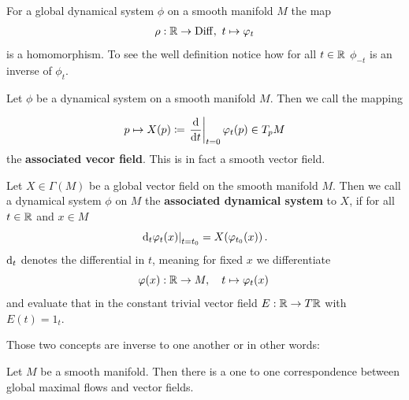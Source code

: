 \begin{corollary}
	For a global dynamical system $\phi$ on a smooth manifold $M$ the map
	\begin{align*}
		\rho: \mathbb{R} \to \operatorname{\mathrm{Diff}},~t\mapsto \varphi_t
	\end{align*}is a homomorphism. To see the well definition notice how for all $t\in \mathbb{R}$ $\phi_{-t}$ is an inverse of $\phi_t$.
\end{corollary}
\begin{definition}
	Let $\phi$ be a dynamical system on a smooth manifold $M$. Then we call the mapping
	
	\begin{align*}
		p\mapsto X(p)\coloneq \left.\frac{\mathop{}\!\mathrm{d} }{\mathop{}\!\mathrm{d} t}\right|_{t=0}\varphi_t(p)\in T_pM
	\end{align*} the \textbf{associated vecor field}. This is in fact a smooth vector field. 
\end{definition}
\begin{definition}
	Let $X\in \Gamma(M)$ be a global vector field on the smooth manifold $M$. Then we call a dynamical system $\phi$ on $M$ the \textbf{associated dynamical system} to $X$, if for all $t\in \mathbb{R}$ and $x\in M$ 
	\begin{equation*}
		\left.\mathop{}\!\mathrm{d}_t \varphi_t(x)\right|_{t=t_0}=X(\varphi_{t_0}(x))\,.
	\end{equation*} $\mathop{}\!\mathrm{d}_t$ denotes the differential in $t$, meaning for fixed $x$ we differentiate 
	\begin{equation*}
		\varphi(x): \mathbb{R}\to M,\quad t\mapsto \varphi_t(x)\,
	\end{equation*} and evaluate that in the constant trivial vector field $E: \mathbb{R}\to T\mathbb{R}$ with $E(t)=1_t$. 
\end{definition}
Those two concepts are inverse to one another or in other words:
\begin{theorem}
	Let $M$ be a smooth manifold. Then there is a one to one correspondence between global maximal flows and vector fields. 
\end{theorem}

